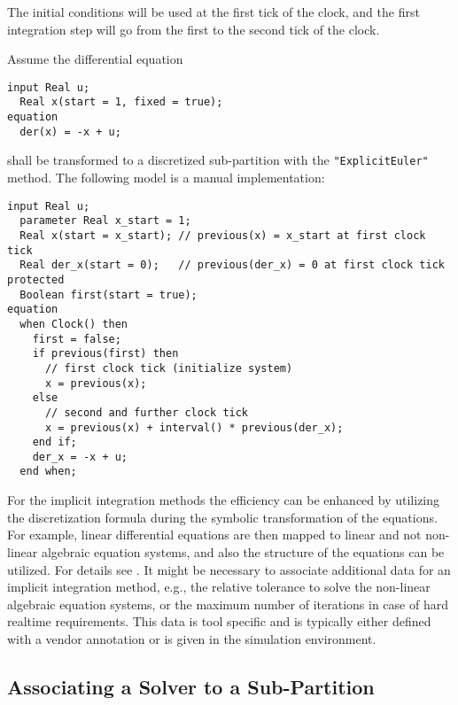 The initial conditions will be used at the first tick of the clock, and
the first integration step will go from the first to the second tick of
the clock.

\begin{example}
Assume the differential equation
\begin{lstlisting}[language=modelica]
  input Real u;
  Real x(start = 1, fixed = true);
equation
  der(x) = -x + u;
\end{lstlisting}
shall be transformed to a discretized sub-partition with the \lstinline!"ExplicitEuler"! method.
The following model is a manual implementation:
\begin{lstlisting}[language=modelica]
  input Real u;
  parameter Real x_start = 1;
  Real x(start = x_start); // previous(x) = x_start at first clock tick
  Real der_x(start = 0);   // previous(der_x) = 0 at first clock tick
protected
  Boolean first(start = true);
equation
  when Clock() then
    first = false;
    if previous(first) then
      // first clock tick (initialize system)
      x = previous(x);
    else
      // second and further clock tick
      x = previous(x) + interval() * previous(der_x);
    end if;
    der_x = -x + u;
  end when;
\end{lstlisting}
\end{example}

\begin{nonnormative}
For the implicit integration methods the efficiency can be enhanced by utilizing the discretization formula during the symbolic transformation of the equations.
For example, linear differential equations are then mapped to linear and not non-linear algebraic equation systems, and also the structure of the equations can be utilized.
For details see \textcite{ElmqvistOtterCellier1995InlineIntegration}.
It might be necessary to associate additional data for an implicit integration method, e.g., the relative tolerance to solve the non-linear algebraic equation systems, or the maximum number of iterations in case of hard realtime requirements.
This data is tool specific and is typically either defined with a vendor annotation or is given in the simulation environment.
\end{nonnormative}

\subsection{Associating a Solver to a Sub-Partition}\label{associating-a-solver-to-a-partition}

